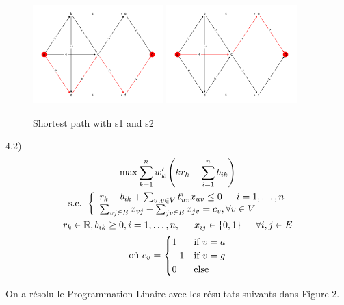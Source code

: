 \documentclass[11pt,A4,french]{article}
\newcommand{\R}{\mathbb{R}}
\begin{document}
\begin{figure}[ht!]
    \centering
    \includegraphics[max width=0.45\textwidth]{images/shortest_path_4_1_s1.png}
    \includegraphics[max width=0.45\textwidth]{images/shortest_path_4_1_s2.png}
    \caption{Shortest path with s1 and s2}
    \label{fig:my_label}
\end{figure}


4.2)
$$
\begin{gathered}
    \max \sum_{k=1}^{n} w_{k}^{\prime}\left(k r_{k}-\sum_{i=1}^{n} b_{i k}\right) \\
    \text { s.c. }\left\{\begin{array}{lr}
    r_{k}-b_{i k} + \sum_{u,v\in V} t_{uv}^ix_{uv} \leq 0 \indent i=1, \ldots, n \\
    \sum_{vj \in E} x_{vj} - \sum_{jv \in E} x_{jv} = c_v , \forall v \in V \\
    \end{array}\right. \\
    r_k \in \R, b_{i k} \geq 0, i=1, \ldots, n,\indent x_{ij} \in \{0,1\} \indent \forall i,j \in E \\
    \text{où } c_v = \begin{cases}
    1 &\text{if } v=a\\
    -1 &\text{if } v=g\\
    0 &\text{else}\\
\end{cases}
\end{gathered}
$$

On a résolu le Programmation Linaire avec les résultats suivants dans Figure 2.
\end{document}
